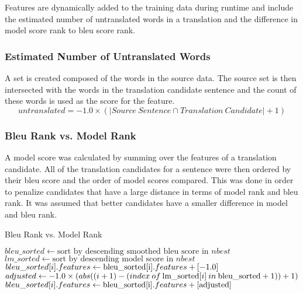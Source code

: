 \documentclass[letterpaper]{article}
\begin{document}
\indent \indent Features are dynamically added to the training data during runtime and include the estimated number of untranslated words in a translation and the difference in model score rank to bleu score rank.

\subsubsection{Estimated Number of Untranslated Words}

\indent \indent A set is created composed of the words in the source data. The source set is then intersected with the words in the translation candidate sentence and the count of these words is used as the score for the feature.
\[untranslated = -1.0 \times (\vert Source\:Sentence \cap Translation\:Candidate\vert + 1)\]

\subsubsection{Bleu Rank vs. Model Rank}

\indent \indent A model score was calculated by summing over the features of a translation candidate. All of the translation candidates for a sentence were then ordered by their bleu score and the order of model scores compared. This was done in order to penalize candidates that have a large distance in terms of model rank and bleu rank. It was assumed that better candidates have a smaller difference in model and bleu rank.

\begin{algorithm}
    \caption{Bleu Rank vs. Model Rank}\label{euclid}
    \begin{algorithmic}[1]
        \State $bleu\_sorted \gets \text{sort by descending smoothed bleu score in $nbest$}$
        \State $lm\_sorted \gets \text{sort by descending model score in $nbest$}$
                \State $bleu\_sorted[i].features \gets \text{\($bleu\_sorted[i]$.features + [-1.0]\)}$
            \Else
                \State $adjusted \gets \text{\(-1.0 \times (abs((i+1) - (index\:of\:$lm\_sorted$[i]\:in\:$bleu\_sorted$\:+\:1)) + 1)\)}$
                \State $bleu\_sorted[i].features \gets \text{\($bleu\_sorted[i]$.features + [$adjusted$]\)}$
            \EndIf
        \EndFor
    \EndFor
    \State {}
    \EndFunction
    \end{algorithmic}
\end{algorithm}
\end{document}
